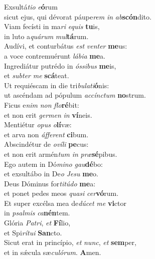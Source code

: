 \evenverse Exsultá\textit{ti}\textit{o} \textit{e}\textbf{ó}rum~\*\\
\evenverse sicut ejus, qui dévorat páupe\textit{rem} \textit{in} \textit{ab}\textbf{scón}dito.\\
\oddverse Viam fecísti in ma\textit{ri} \textit{e}\textit{quis} \textbf{tu}is,~\*\\
\oddverse in luto a\textit{quá}\textit{rum} \textit{mul}\textbf{tá}rum.\\
\evenverse Audívi, et conturbátus \textit{est} \textit{ven}\textit{ter} \textbf{me}us:~\*\\
\evenverse a voce contremuérunt \textit{lá}\textit{bi}\textit{a} \textbf{me}a.\\
\oddverse Ingrediátur putrédo in \textit{ós}\textit{si}\textit{bus} \textbf{me}is,~\*\\
\oddverse et \textit{sub}\textit{ter} \textit{me} \textbf{scá}teat.\\
\evenverse Ut requiéscam in die tri\textit{bu}\textit{la}\textit{ti}\textbf{ó}nis:~\*\\
\evenverse ut ascéndam ad pópulum \textit{ac}\textit{cín}\textit{ctum} \textbf{no}strum.\\
\oddverse Ficus e\textit{nim} \textit{non} \textit{flo}\textbf{ré}bit:~\*\\
\oddverse et non erit \textit{ger}\textit{men} \textit{in} \textbf{ví}neis.\\
\evenverse Mentiétur \textit{o}\textit{pus} \textit{o}\textbf{lí}væ:~\*\\
\evenverse et arva non \textit{áf}\textit{fe}\textit{rent} \textbf{ci}bum.\\
\oddverse Abscindétur de \textit{o}\textit{ví}\textit{li} \textbf{pe}cus:~\*\\
\oddverse et non erit armén\textit{tum} \textit{in} \textit{præ}\textbf{sé}pibus.\\
\evenverse Ego autem in Dó\textit{mi}\textit{no} \textit{gau}\textbf{dé}bo:~\*\\
\evenverse et exsultábo in De\textit{o} \textit{Je}\textit{su} \textbf{me}o.\\
\oddverse Deus Dóminus for\textit{ti}\textit{tú}\textit{do} \textbf{me}a:~\*\\
\oddverse et ponet pedes meos \textit{qua}\textit{si} \textit{cer}\textbf{vó}rum.\\
\evenverse Et super excélsa mea de\textit{dú}\textit{cet} \textit{me} \textbf{vi}ctor~\*\\
\evenverse in \textit{psal}\textit{mis} \textit{ca}\textbf{nén}tem.\\
\oddverse Glória \textit{Pa}\textit{tri}, \textit{et} \textbf{Fí}lio,~\*\\
\oddverse et Spi\textit{rí}\textit{tu}\textit{i} \textbf{San}cto.\\
\evenverse Sicut erat in princípio, \textit{et} \textit{nunc}, \textit{et} \textbf{sem}per,~\*\\
\evenverse et in sǽcula sæ\textit{cu}\textit{ló}\textit{rum}. \textbf{A}men.\\
